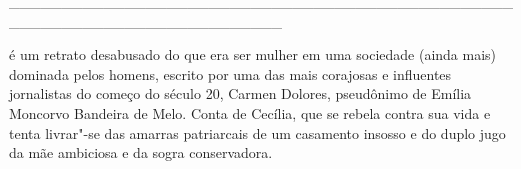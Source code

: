 \hspace*{-2cm}\_\_\_\_\_\_\_\_\_\_\_\_\_\_\_\_\_\_\_\_\_\_\_\_\_\_\_\_\_\_\_\_\_\_\_\_\_\_\_\_\_\_\_\_\_\_\_\_\_\_\_\_\_\_\_\_\_\_\_\_\_\_\_\_\_\_\_\_\_\_\_\_\_\_

\medskip

 é um retrato desabusado do que era ser mulher em uma sociedade (ainda mais) dominada pelos homens, escrito por uma das mais corajosas e influentes jornalistas do começo do século 20, Carmen Dolores, pseudônimo de Emília Moncorvo Bandeira de Melo. Conta de Cecília, que se rebela contra sua vida e tenta livrar"-se das amarras patriarcais de um casamento insosso e do duplo jugo da mãe ambiciosa e da sogra conservadora.

\vfill

\hspace*{-.4cm}\begin{minipage}[c]{0.45\linewidth}
\small{
{}}
\end{minipage}

\pagebreak


